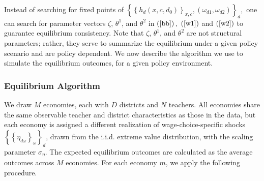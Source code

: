 \documentclass[notitlepage,12pt]{article}%
\begin{document}
Instead of searching for fixed points of $\left\{  \left\{  h_{d}\left(
x,c,d_{0}\right)  \right\}  _{x,c},\left(  \omega_{d1},\omega_{d2}\right)
\right\}  _{d},$ one can search for parameter vectors $\zeta$, $\theta^{1}$,
and $\theta^{2}$ in $\left(  \ref{bb}\right)  ,$ $\left(  \ref{w1}\right)  $
and $\left(  \ref{w2}\right)  $ to guarantee equilibrium consistency. Note
that $\zeta$, $\theta^{1}$, and $\theta^{2}$ are not structural parameters;
rather, they serve to summarize the equilibrium under a given policy scenario
and are policy dependent. We now describe the algorithm we use to simulate the
equilibrium outcomes, for a given policy environment.

\subsubsection{Equilibrium Algorithm}

We draw $M$ economies, each with $D$ districts and $N$ teachers. All economies
share the same observable teacher and district characteristics as those in the
data, but each economy is assigned a different realization of
wage-choice-specific shocks $\left\{  \left\{  \eta_{d\omega}\right\}
_{\omega}\right\}  _{d}$, drawn from the i.i.d. extreme value distribution,
with the scaling parameter $\sigma_{\eta}$. The expected equilibrium outcomes
are calculated as the average outcomes across $M$ economies. For each economy
$m$, we apply the following procedure.
\end{document}
